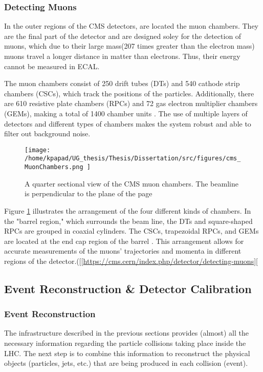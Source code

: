 \subsubsection{Detecting Muons}
\label{sec:org8c95f86}
In the outer regions of the CMS detectors, are located the muon chambers. They are the final part of the detector and are designed soley for the detection of muons, which due to their large mass(207 times greater than the electron mass) muons travel a longer distance in matter than electrons. Thus, their energy cannot be measured in ECAL. 

The muon chambers consist of 250 drift tubes (DTs) and 540 cathode strip chambers (CSCs), which track the positions of the particles. Additionally, there are 610 resistive plate chambers (RPCs) and 72 gas electron multiplier chambers (GEMs), making a total of 1400 chamber units . The use of multiple layers of detectors and different types of chambers makes the system robust and able to filter out background noise.

\begin{figure}[ht]
\centering
\texttt{[image: /home/kpapad/UG\_thesis/Thesis/Dissertation/src/figures/cms\_MuonChambers.png ]}
\caption{A quarter sectional view of the CMS muon chambers. The beamline is perpendicular to the plane of the page}
\label{fig:muon_chambers}
\end{figure}

Figure \ref{fig:muon_chambers} illustrates the arrangement of the four different kinds of chambers. In the "barrel region," which surrounds the beam line, the DTs and square-shaped RPCs are grouped in coaxial cylinders. The CSCs, trapezoidal RPCs, and GEMs are located at the end cap region of the barrel . This arrangement allows for accurate measurements of the muons' trajectories and momenta in different regions of the detector.([[\url{https://cms.cern/index.php/detector/detecting-muons}][
\subsection{Event Reconstruction \& Detector Calibration}
\label{sec:org3fecb86}
\subsubsection{Event Reconstruction}
\label{sec:orgfae79d0}
The infrastructure described in the previous sections provides (almost) all the necessary information regarding the particle collisions taking place inside the LHC. The next step is to combine this information to reconstruct the physical objects (particles, jets, etc.) that are being produced in each collision (event).

